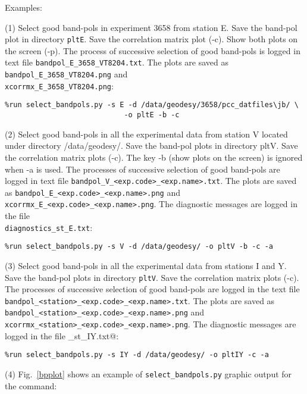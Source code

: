 \documentclass[preprint]{aastex}
\begin{document}
Examples:

(1) Select good band-pols in experiment 3658 from station E. Save the band-pol
plot in directory \texttt{pltE}. Save the correlation matrix plot (-c). Show both plots
on the screen (-p). 
The process of successive selection of good band-pols is logged in text file 
\verb$bandpol_E_3658_VT8204.txt$. 
The plots are saved as \verb$bandpol_E_3658_VT8204.png$ and \\
\verb$xcorrmx_E_3658_VT8204.png$: 

\verb$%run select_bandpols.py -s E -d /data/geodesy/3658/pcc_datfiles\jb/ \$ \\
\verb$                            -o pltE -b -c$

(2) Select good band-pols in all the experimental data from station V
located under directory /data/geodesy/. 
Save the band-pol plots in directory pltV. Save the correlation matrix plots
(-c). The key -b (show plots on the screen) is ignored when -a is used.  
The processes of successive selection of good band-pols are
logged in text file \verb$bandpol_V_<exp.code>_<exp.name>.txt$. 
The plots are saved as \verb$bandpol_E_<exp.code>_<exp.name>.png$ and \\
\verb$xcorrmx_E_<exp.code>_<exp.name>.png$.
The diagnostic messages are logged in the file\\
\verb$diagnostics_st_E.txt$:

\verb$%run select_bandpols.py -s V -d /data/geodesy/ -o pltV -b -c -a$

(3) Select good band-pols in all the experimental data from stations
I and Y. Save the band-pol plots in directory \verb$pltV$. Save the correlation matrix
plots (-c).  
The processes of successive selection of good band-pols are logged in the text file \verb$bandpol_<station>_<exp.code>_<exp.name>.txt$. The plots are saved as \verb$bandpol_<station>_<exp.code>_<exp.name>.png$ and \\
\verb$xcorrmx_<station>_<exp.code>_<exp.name>.png$.
The diagnostic messages are logged in the file \verb@diagnostics_st_IY.txt@:

\verb$%run select_bandpols.py -s IY -d /data/geodesy/ -o pltIY -c -a$

(4) Fig.~\ref{bpplot} shows an example of \verb$select_bandpols.py$ graphic output for the command: \\
\verb@%run select_bandpols.py -s E -d /data/geodesy/3715/pcc_datfiles/ -o 3715 -m 0.98 -b -c@

\begin{figure*}   [ht!]
\caption{\small A plot of all the band-pol channels performed by \texttt{select\_bandpols.py}. The channels A:X and B:Y were rejected because the median of cross-correlations with all other channels is less than 0.98. Another parameter, the multiple correlation coefficient (Mult-corr), is printed next to Median for comparison.
\label{bpplot}}
\end{figure*}
\end{document}
